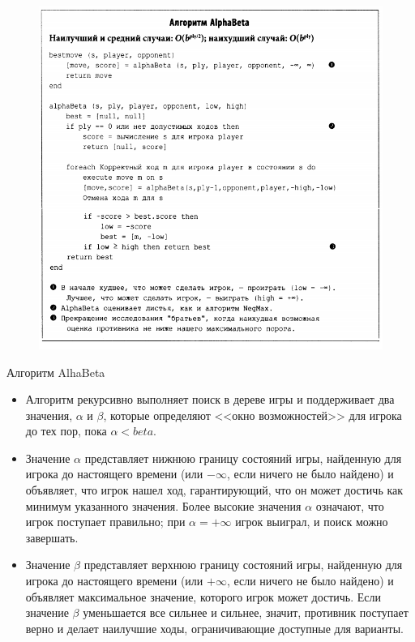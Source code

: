\documentclass{beamer}
\begin{document}
\begin{frame}
\begin{figure}[h]
\centering
\includegraphics[scale=0.4]{images/lec05-pic10.png}
\end{figure}
\end{frame}

\begin{frame}{Алгоритм AlhaBeta}
\begin{itemize}
\item Алгоритм рекурсивно выполняет поиск в дереве игры и поддерживает
два значения, $\alpha$ и $\beta$, которые определяют <<окно возможностей>> для игрока до тех пор, пока $\alpha < beta$. 
\item Значение $\alpha$ представляет нижнюю границу состояний игры, найденную для игрока до настоящего времени (или $-\infty$, если ничего не было найдено)
и объявляет, что игрок нашел ход, гарантирующий, что он может достичь как минимум указанного значения. Более высокие значения $\alpha$ означают, что игрок поступает правильно; при $\alpha = +\infty$ игрок выиграл, и поиск можно завершать.
\item Значение $\beta$ представляет верхнюю границу состояний игры, найденную для игрока до настоящего времени (или $+\infty$, если ничего не было найдено) и объявляет максимальное значение, которого игрок может достичь. Если значение $\beta$ уменьшается все сильнее и сильнее, значит, противник поступает верно и делает наилучшие ходы, ограничивающие доступные для варианты. 
\end{itemize}
\end{frame}
\end{document}
